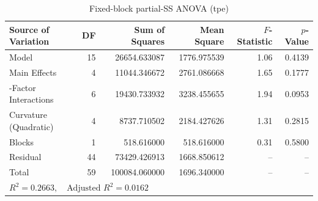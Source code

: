 \begin{table}[htbp]
\centering
\caption{Fixed-block partial-SS ANOVA (tpe)}
\label{tab:anova_0_tpe_latency_us}
\begin{tabular}{lrrrrr}
\hline
\textbf{Source of Variation} & \textbf{DF} & \textbf{Sum of Squares} & \textbf{Mean Square} & \textbf{$F$-Statistic} & \textbf{$p$-Value} \\
\hline
Model & 15 & 26654.633087 & 1776.975539 & 1.06 & 0.4139 \\
\quad Main Effects & 4 & 11044.346672 & 2761.086668 & 1.65 & 0.1777 \\
\quad 2-Factor Interactions & 6 & 19430.733932 & 3238.455655 & 1.94 & 0.0953 \\
\quad Curvature (Quadratic) & 4 & 8737.710502 & 2184.427626 & 1.31 & 0.2815 \\
\quad Blocks & 1 & 518.616000 & 518.616000 & 0.31 & 0.5800 \\
Residual & 44 & 73429.426913 & 1668.850612 & -- & -- \\
Total & 59 & 100084.060000 & 1696.340000 & -- & -- \\
\hline
\multicolumn{6}{l}{\small $R^2 = 0.2663, \quad \text{Adjusted } R^2 = 0.0162$} \\
\hline
\end{tabular}
\end{table}